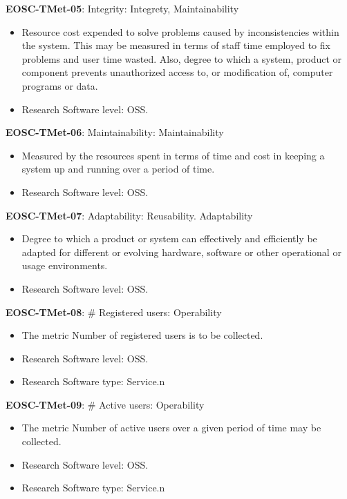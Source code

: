 \textbf{EOSC-TMet-05}: Integrity: Integrety, Maintainability

\begin{itemize}
    \item Resource cost expended to solve problems caused by inconsistencies within the system. This may be measured in terms of staff time employed to fix problems and user time wasted. Also, degree to which a system, product or component prevents unauthorized access to, or modification of,
computer programs or data. \cite{iso_25010_2011_2017,gillies_modelling_1992}
    \item Research Software level: OSS.
\end{itemize}

\textbf{EOSC-TMet-06}: Maintainability: Maintainability

\begin{itemize}
    \item Measured by the resources spent in terms of time and cost in keeping a system up and running over a period of time. \cite{gillies_modelling_1992,boehm_quantitative_1976}
    \item Research Software level: OSS.
\end{itemize}

\textbf{EOSC-TMet-07}: Adaptability: Reusability. Adaptability

\begin{itemize}
    \item Degree to which a product or system can effectively and efficiently be adapted for different or evolving hardware, software or other operational or usage environments. \cite{iso_25010_2011_2017,gillies_modelling_1992,boehm_quantitative_1976}
    \item Research Software level: OSS.
\end{itemize}

\textbf{EOSC-TMet-08}: \# Registered users: Operability

\begin{itemize}
    \item The metric Number of registered users is to be collected. \cite{orviz_fernandez_eosc-synergy_2020}
    \item Research Software level: OSS.
    \item Research Software type: Service.n\end{itemize}

\textbf{EOSC-TMet-09}: \# Active users: Operability

\begin{itemize}
    \item The metric Number of active users over a given period of time may be collected. \cite{orviz_fernandez_eosc-synergy_2020}
    \item Research Software level: OSS.
    \item Research Software type: Service.n\end{itemize}

